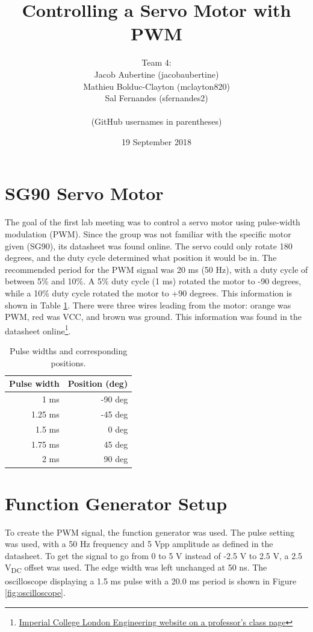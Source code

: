 \documentclass{article}
\title{Controlling a Servo Motor with PWM}
\date{19 September 2018}
\author{
	Team 4:
	\\
	Jacob Aubertine (jacobaubertine)
	\\
	Mathieu Bolduc-Clayton (mclayton820)
	\\
	Sal Fernandes (sfernandes2)
	\\
	\\
	(GitHub usernames in parentheses)
}
\begin{document}
	\maketitle
	\newpage

	\section{SG90 Servo Motor}
	The goal of the first lab meeting was to control a servo motor using pulse-width modulation (PWM). Since the group was not familiar with the specific motor given (SG90), its datasheet was found online. The servo could only rotate 180 degrees, and the duty cycle determined what position it would be in. The recommended period for the PWM signal was 20 ms (50 Hz), with a duty cycle of between 5\% and 10\%. A 5\% duty cycle (1 ms) rotated the motor to -90 degrees, while a 10\% duty cycle rotated the motor to +90 degrees. This information is shown in Table \ref{tab:table1}. There were three wires leading from the motor: orange was PWM, red was VCC, and brown was ground. This information was found in the datasheet online\footnote{\href{http://www.ee.ic.ac.uk/pcheung/teaching/DE1_EE/stores/sg90_datasheet.pdf}{Imperial College London Engineering website on a professor's class page}}.

	\begin{table}[h!]
  		\begin{center}
    			\caption{Pulse widths and corresponding positions.}
    			\label{tab:table1}
    			\begin{tabular}{r|r}
      				\textbf{Pulse width} & \textbf{Position (deg)} \\
				\hline
      				1 ms& -90 deg\\
      				1.25 ms & -45 deg\\
      				1.5 ms & 0 deg\\
      				1.75 ms & 45 deg\\
				2 ms& 90 deg\\
   			 \end{tabular}
  		\end{center}
	\end{table}

	\section{Function Generator Setup}
	To create the PWM signal, the function generator was used. The pulse setting was used, with a 50 Hz frequency and 5 Vpp amplitude as defined in the datasheet. To get the signal to go from 0 to 5 V instead of -2.5 V to 2.5 V, a 2.5 V\textsubscript{DC} offset was used. The edge width was left unchanged at 50 ns. The oscilloscope displaying a 1.5 ms pulse with a 20.0 ms period is shown in Figure \ref{fig:oscilloscope}.
\end{document}

